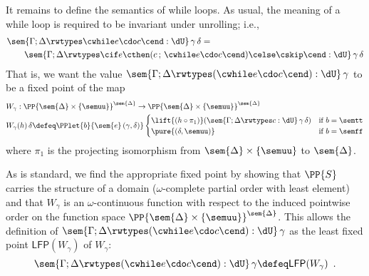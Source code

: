 It remains to define the semantics of while loops.
As usual, the meaning of a while loop is required to be invariant under unrolling; i.e.,
\begin{align*}
& \sem{\Gamma;\Delta \rwtypes \cwhile e \cdo c \cend :\dU}\,\gamma\,\delta  = 
\\
& \qquad \sem{\Gamma;\Delta \rwtypes\cif e \cthen (c\, ; \, \cwhile e \cdo c \cend) \celse \cskip \cend :\dU}\,\gamma\,\delta
\end{align*}
That is, we want the value $\sem{\Gamma ; \Delta \rwtypes (\cwhile e \cdo c \cend) : \dU} \, \gamma $ to be a fixed point of the map 
%
\begin{equation}
  \label{eq:def-W}
  \begin{aligned}
    W_{\gamma} &:  \PP{\sem{\Delta} \times \{\semuu\}}^{\sem{\Delta}}
    \to \PP{\sem{\Delta} \times \{\semuu\}}^{\sem{\Delta}}
    \\
    W_\gamma&(h) \, \delta 
    \defeq \PPlet{b}{\sem{e}\,(\gamma,\delta)}
      \begin{cases}
        \lift{(h \circ \pi_1)}(\sem{\Gamma; \Delta \rwtypes c : \dU}\,\gamma\,\delta) & \text{if $b = \semtt$} \\
        \pure{(\delta, \semuu)} & \text{if $b = \semff$}
      \end{cases}
  \end{aligned}
\end{equation}
%
where $\pi_1$ is the projecting isomorphism from $\sem{\Delta} \times \{\semuu\}$ to $\sem{\Delta}$.

As is standard, we find the appropriate fixed point  by showing that $\PP{S}$ carries the structure of a domain ($\omega$-complete partial order with least element) and that $W_\gamma$ is an $\omega$-continuous function with respect to the induced pointwise order on the function space 
$\PP{\sem{\Delta} \times \{\semuu\}}^{\sem{\Delta}}$.
This allows the definition of $\sem{\Gamma ; \Delta \rwtypes (\cwhile e \cdo c \cend) : \dU} \, \gamma $ as the least fixed point $\mathsf{LFP}(W_\gamma)$ of $W_\gamma$:
%
\begin{equation}
\label{equation:lfp}
  \sem{\Gamma ; \Delta \rwtypes (\cwhile e \cdo c \cend) : \dU} \, \gamma  \defeq
  \mathsf{LFP}(W_\gamma) \enspace .
\end{equation}
%


